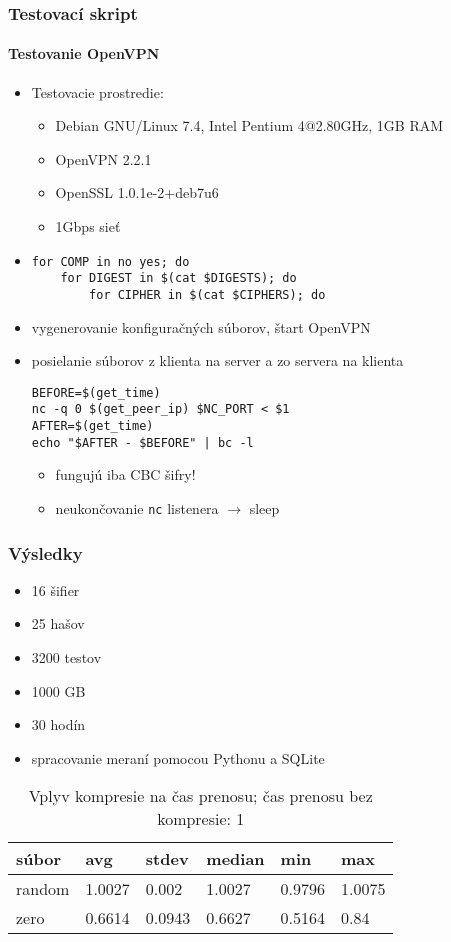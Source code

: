 \documentclass{beamer}
\begin{document}
\begin{frame}[fragile]
	\frametitle{Testovací skript}
	\framesubtitle{Testovanie OpenVPN}
	\begin{itemize}
		\item Testovacie prostredie:
			\begin{itemize}
				\item Debian GNU/Linux 7.4, Intel Pentium 4@2.80GHz, 1GB RAM
				\item OpenVPN 2.2.1
				\item OpenSSL 1.0.1e-2+deb7u6
				\item 1Gbps sieť
			\end{itemize}
		\item
{\small
\begin{verbatim}
for COMP in no yes; do
    for DIGEST in $(cat $DIGESTS); do
        for CIPHER in $(cat $CIPHERS); do
\end{verbatim}
}
		\item vygenerovanie konfiguračných súborov, štart OpenVPN
		\item posielanie súborov z klienta na server a zo servera na klienta
{\tiny
\begin{verbatim}
BEFORE=$(get_time)
nc -q 0 $(get_peer_ip) $NC_PORT < $1
AFTER=$(get_time)
echo "$AFTER - $BEFORE" | bc -l
\end{verbatim}
}
			\begin{itemize} 
				\item fungujú iba CBC šifry!
				\item neukončovanie \texttt{nc} listenera $\rightarrow$ sleep
			\end{itemize}	

	\end{itemize}
\end{frame}

\begin{frame}
	\frametitle{Výsledky}
	\begin{itemize}
		\item 16 šifier
		\item 25 hašov
		\item 3200 testov
		\item 1000 GB
		\item 30 hodín
		\item spracovanie meraní pomocou Pythonu a SQLite
	\end{itemize}
	\begin{table}
		\begin{tabular}{|l||l|l|l|l|l|}
			\hline
			\bf súbor & \bf  avg & \bf stdev & \bf median & \bf min & \bf max \\ \hline 
			random & 1.0027 & 0.002 & 1.0027 & 0.9796 & 1.0075 \\ \hline
			zero & 0.6614 & 0.0943 & 0.6627 & 0.5164 & 0.84\\ \hline
		\end{tabular}
		\caption{Vplyv kompresie na čas prenosu; čas prenosu bez kompresie: 1}
	\end{table}
\end{frame}
\end{document}
